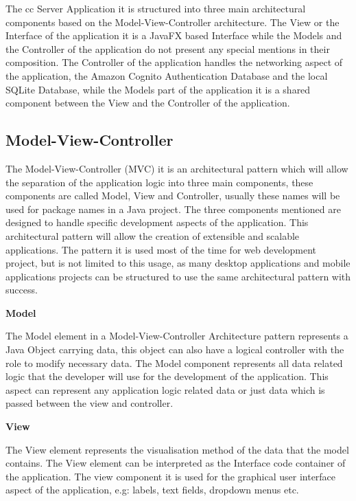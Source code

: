 The \acrfull{cc} Server Application it is structured into three main architectural components based
on the Model-View-Controller architecture. The View or the Interface of the application it is a
JavaFX based Interface while the Models and the Controller of the application do not present any
special mentions in their composition. The Controller of the application handles the networking aspect
of the application, the Amazon Cognito Authentication Database and the local SQLite Database, while
the Models part of the application it is a shared component between the View and the Controller of the
application.

\subsection{Model-View-Controller}

The Model-View-Controller (MVC) it is an architectural pattern which will allow
the separation of the application logic into three main components, these components are
called Model, View and Controller, usually these names will be used for package names in
a Java project. The three components mentioned are designed to handle specific development
aspects of the application. This architectural pattern will allow the creation of extensible
and scalable applications. The pattern it is used most of the time for web development
project, but is not limited to this usage, as many desktop applications and mobile applications
projects can be structured to use the same architectural pattern with success. \newline

\noindent
\textbf{Model}
\newline

The Model element in a Model-View-Controller Architecture pattern represents a Java
Object carrying data, this object can also have a logical controller with the role to
modify necessary data. The Model component represents all data related logic that the
developer will use for the development of the application. This aspect can represent
any application logic related data or just data which is passed between the view and
controller. \newline

\noindent
\textbf{View}
\newline

The View element represents the visualisation method of the data that the
model contains. The View element can be interpreted as the Interface code container
of the application. The view component it is used for the graphical user interface
aspect of the application, e.g: labels, text fields, dropdown menus etc. \newline

